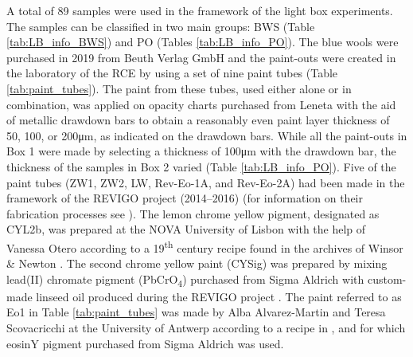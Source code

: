 A total of 89 samples were used in the framework of the light box experiments. The samples can be classified in two main groups: \gls{BWS} (Table \ref{tab:LB_info_BWS}) and \gls{PO} (Tables \ref{tab:LB_info_PO}). The blue wools were purchased in 2019 from Beuth Verlag GmbH and the paint-outs were created in the laboratory of the \gls{RCE} by using a set of nine paint tubes (Table \ref{tab:paint_tubes}). The paint from these tubes, used either alone or in combination, was applied on opacity charts purchased from Leneta with the aid of metallic drawdown bars to obtain a reasonably even paint layer thickness of 50, 100, or 200\unit{\um}, as indicated on the drawdown bars. While all the paint-outs in Box 1 were made by selecting a thickness of 100\unit{\um} with the drawdown bar, the thickness of the samples in Box 2 varied (Table \ref{tab:LB_info_PO}). Five of the paint tubes (\gls{ZW1}, \gls{ZW2}, \gls{LW}, \gls{Rev-Eo-1A}, and \gls{Rev-Eo-2A}) had been made in the framework of the \gls{REVIGO} project (2014–2016) (for information on their fabrication processes see \citet{geldof_reconstructing_2018}). The lemon chrome yellow pigment, designated as \gls{CYL2b}, was prepared at the NOVA University of Lisbon with the help of Vanessa Otero according to a 19\textsuperscript{th} century recipe found in the archives of Winsor \& Newton \citep{otero_nineteenth_2017, otero_historically_2018}. The second chrome yellow paint (\gls{CYSig}) was prepared by mixing lead(II) chromate pigment (PbCrO\textsubscript{4}) purchased from Sigma Aldrich with custom-made linseed oil produced during the \gls{REVIGO} project \citep[3-6]{geldof_reconstructing_2018}. The paint referred to as \gls{Eo1} in Table \ref{tab:paint_tubes} was made by Alba Alvarez-Martin and Teresa Scovacricchi at the University of Antwerp according to a recipe in \citet{claro_identification_2010}, and for which eosinY pigment purchased from Sigma Aldrich was used.\\

